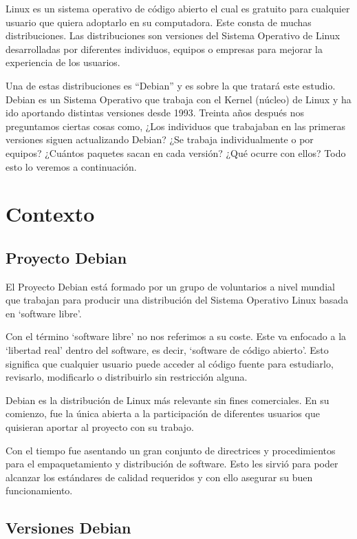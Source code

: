 \documentclass[a4paper, 12pt]{book}
\begin{document}
Linux es un sistema operativo de código abierto el cual es gratuito para cualquier usuario que quiera adoptarlo en su computadora. Este consta de muchas distribuciones. Las distribuciones son versiones del Sistema Operativo de Linux desarrolladas por diferentes individuos, equipos o empresas para mejorar la experiencia de los usuarios.

Una de estas distribuciones es “Debian” y es sobre la que tratará este estudio.
Debian es un Sistema Operativo que trabaja con el Kernel (núcleo) de Linux y ha ido aportando distintas versiones desde 1993. 
Treinta años después nos preguntamos ciertas cosas como, ¿Los individuos que trabajaban en las primeras versiones siguen actualizando Debian? ¿Se trabaja individualmente o por equipos? ¿Cuántos paquetes sacan en cada versión? ¿Qué ocurre con ellos? Todo esto lo veremos a continuación.



\section{Contexto}
\label{sec:contexto}



\subsection{Proyecto Debian}
\label{subsec:proyecto debian}

El Proyecto Debian está formado por un grupo de voluntarios a nivel mundial que trabajan para producir una distribución del Sistema Operativo Linux basada en `software libre'.

Con el término `software libre' no nos referimos a su coste. Este va enfocado a la `libertad real' dentro del software, es decir, `software de código abierto'.
Esto significa que cualquier usuario puede acceder al código fuente para estudiarlo, revisarlo, modificarlo o distribuirlo sin restricción alguna.

Debian es la distribución de Linux más relevante sin fines comerciales.
En su comienzo, fue la única abierta a la participación de diferentes usuarios que quisieran aportar al proyecto con su trabajo.

Con el tiempo fue asentando un gran conjunto de directrices y procedimientos para el empaquetamiento y distribución de software. Esto les sirvió para poder alcanzar los estándares de calidad requeridos y con ello asegurar su buen funcionamiento.

\subsection{Versiones Debian}
\label{subsec:versiones debian}
\end{document}
